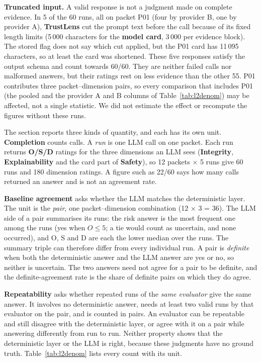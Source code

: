 \textbf{Truncated input.} A valid response is not a judgment made on complete evidence. In 5 of the 60 runs, all on packet P01 (four by provider B, one by provider A), \textbf{TrustLens} cut the prompt text before the call because of its fixed length limits (5\,000 characters for the \textbf{model card}, 3\,000 per evidence block). The stored flag does not say which cut applied, but the P01 card has 11\,095 characters, so at least the card was shortened. These five responses satisfy the output schema and count towards 60/60. They are neither failed calls nor malformed answers, but their ratings rest on less evidence than the other 55. P01 contributes three packet--dimension pairs, so every comparison that includes P01 (the pooled and the provider A and B columns of Table~\ref{tab:l2denom}) may be affected, not a single statistic. We did not estimate the effect or recompute the figures without these runs.

The section reports three kinds of quantity, and each has its own unit. \textbf{Completion} counts calls. A \emph{run} is one LLM call on one packet. Each run returns \textbf{O/S/D} ratings for the three dimensions an LLM sees (\textbf{Integrity}, \textbf{Explainability} and the card part of \textbf{Safety}), so 12 packets $\times$ 5 runs give 60 runs and 180 dimension ratings. A figure such as 22/60 says how many calls returned an answer and is not an agreement rate.

\textbf{Baseline agreement} asks whether the LLM matches the deterministic layer. The unit is the \emph{pair}, one packet--dimension combination (12 $\times$ 3 = 36). The LLM side of a pair summarises its runs: the risk answer is the most frequent one among the runs (yes when $O\le5$; a tie would count as uncertain, and none occurred), and O, S and D are each the lower median over the runs. The summary triple can therefore differ from every individual run. A pair is \emph{definite} when both the deterministic answer and the LLM answer are yes or no, so neither is uncertain. The two answers need not agree for a pair to be definite, and the definite-agreement rate is the share of definite pairs on which they do agree.

\textbf{Repeatability} asks whether repeated runs of the \emph{same evaluator} give the same answer. It involves no deterministic answer, needs at least two valid runs by that evaluator on the pair, and is counted in pairs. An evaluator can be repeatable and still disagree with the deterministic layer, or agree with it on a pair while answering differently from run to run. Neither property shows that the deterministic layer or the LLM is right, because these judgments have no ground truth. Table~\ref{tab:l2denom} lists every count with its unit.

